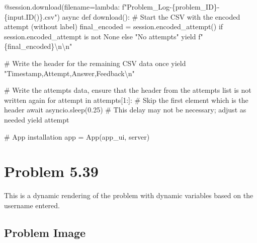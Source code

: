\documentclass[
  letterpaper,
  DIV=11,
  numbers=noendperiod]{scrreprt}
\newenvironment{Shaded}{\begin{snugshade}}{\end{snugshade}}
\newcommand{\NormalTok}[1]{\textcolor[rgb]{0.00,0.23,0.31}{#1}}
\begin{document}
\begin{Shaded}
\begin{Highlighting}[]
\NormalTok{    @session.download(filename=lambda: f"Problem\_Log{-}\{problem\_ID\}{-}\{input.ID()\}.csv")}
\NormalTok{    async def download():}
\NormalTok{        \# Start the CSV with the encoded attempt (without label)}
\NormalTok{        final\_encoded = session.encoded\_attempt() if session.encoded\_attempt is not None else "No attempts"}
\NormalTok{        yield f"\{final\_encoded\}\textbackslash{}n\textbackslash{}n"}
        
\NormalTok{        \# Write the header for the remaining CSV data once}
\NormalTok{        yield "Timestamp,Attempt,Answer,Feedback\textbackslash{}n"}
        
\NormalTok{        \# Write the attempts data, ensure that the header from the attempts list is not written again}
\NormalTok{        for attempt in attempts[1:]:  \# Skip the first element which is the header}
\NormalTok{            await asyncio.sleep(0.25)  \# This delay may not be necessary; adjust as needed}
\NormalTok{            yield attempt}


\NormalTok{\# App installation}
\NormalTok{app = App(app\_ui, server)}
\end{Highlighting}
\end{Shaded}

\chapter*{Problem 5.39}\label{problem-5.39}


This is a dynamic rendering of the problem with dynamic variables based
on the username entered.

\section*{Problem Image}\label{problem-image-52}

\end{document}
